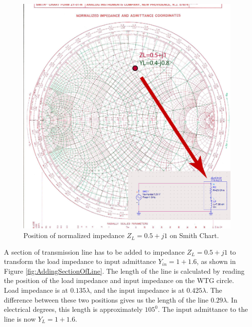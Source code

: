 \documentclass{ximera}
\begin{document}
\begin{figure}[htbp]
\begin{center}
\includegraphics[scale=1]{../jpg/MixedMatch2-01.jpg}
\end{center}
\caption{Position of normalized impedance $Z_L=0.5+j1$ on Smith Chart.}
\label{fig:NormImponSC}
\end{figure}

A section of transmission line has to be added to impedance $Z_L=0.5+j1$ to transform the load impedance to input admittance $Y_{in}=1+1.6$, as shown in Figure \ref{fig:AddingSectionOfLine}. The length of the line is calculated by reading the position of the load impedance and input impedance on the WTG circle. Load impedance is at $0.135 \lambda$, and the input impedance is at $0.425 \lambda$. The difference between these two positions gives us the length of the line $0.29 \lambda$. In electrical degrees, this length is approximately $105^0$. The input admittance to the line is now $Y_L=1+1.6$. 
\end{document}
